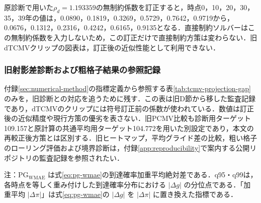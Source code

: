 \documentclass[10pt,a4paper]{article}
\theoremstyle{plain}
\theoremstyle{definition}
\begin{document}
原診断で用いた$\rho_d=1.193359$の無制約係数を訂正すると，時点0，10，20，30，35，39年の値は，0.0890，0.1819，0.3269，0.5729，0.7642，0.9719から，0.0676，0.1312，0.2316，0.4242，0.6165，0.9135となる．直接制約ソルバーはこの無制約係数を入力しないため，この訂正だけで直接制約方策は変わらない．旧dTCMVクリップの図表は，訂正後の近似性能として利用できない．

\clearpage
\subsubsection{旧射影差診断および粗格子結果の参照記録}
付録\ref{sec:numerical-method}の指標定義から参照する表\ref{tab:tcmv-projection-gap}のみを，旧診断との対応を追うために残す．この表は旧D節から移した監査記録であり，dTCMVのクリップには符号訂正前の係数が使われている．数値は訂正後の近似精度や現行方策の優劣を表さない．旧PCMV比較も診断用ターゲット109.157と原計算の共通平均用ターゲット104.772を用いた別設定であり，本文の再較正後方策とは区別する．旧ヒートマップ，平均グライド差の比較，粗い格子のローリング評価および境界診断は，付録\ref{app:reproducibility}で案内する公開リポジトリの監査記録を参照されたい．

\begin{table}[H]
\centering
\caption{月次診断格子上の射影差診断（訂正前の監査記録）}
\label{tab:tcmv-projection-gap}
\begin{flushleft}
\footnotesize 注：$\mathrm{PG}_{\mathrm{WMAE}}$ は式\eqref{eq:pg-wmae}の到達確率加重平均絶対差である．q95・q99は，各時点を等しく重み付けした到達確率分布における $|\Delta g|$ の分位点である．「加重平均 $|\Delta\pi|$」は式\eqref{eq:pg-wmae}の $|\Delta g|$ を $|\Delta\pi|$ に置き換えた指標である．
\end{flushleft}
\end{table}
\end{document}
